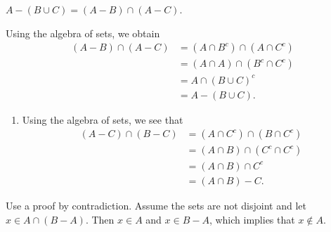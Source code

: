 


\begin{list}{\bf{\ref{exer:sec43-5}.}}
\item \begin{list}{\bf{(a)}}
\item $A - ( {B \cup C} ) = ( {A - B} ) \cap ( {A - C} )$.
\end{list}
\end{list}

\begin{list}{}
\item \begin{list}{\bf{(c)}}
\item Using the algebra of sets, we obtain
\begin{align*}
( A - B ) \cap ( A - C ) &= ( A \cap B^c ) \cap ( A \cap C^c ) \\
  &= ( A \cap A ) \cap ( B^c \cap C^c ) \\
  &= A \cap ( B \cup C )^c \\
  &= A - ( B \cup C ).
\end{align*}
\end{list}
\end{list}


\begin{list}{\bf{\ref{exer53:exer6}.}}
\item \begin{enumerate}
\item Using the algebra of sets, we see that
\begin{align*}
(A - C) \cap (B - C) &= (A \cap C^c) \cap (B \cap C^c) \\
                     &= (A \cap B) \cap (C^c \cap C^c) \\
                     &= (A \cap B) \cap C^c \\
                     &= (A \cap B) - C.
\end{align*}
\end{enumerate}
\end{list}


\begin{list}{\bf{\ref{exer:sec43-7}.}}
\item \begin{list}{\bf{(a)}}
\item Use a proof by contradiction.  Assume the sets are not disjoint and let 
$x \in A \cap ( B - A )$.  Then $x \in A$ and $x \in B - A$, which implies that 
$x \notin A$.
\end{list}
\end{list}
\hbreak
\renewcommand{\labelenumi}{\textbf{\arabic{enumi}.}}

\endinput

